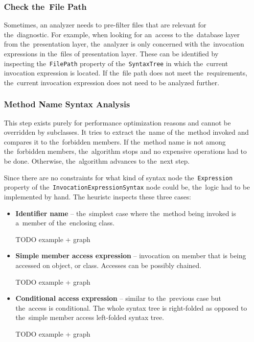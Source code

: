 \documentclass[
  digital, %
  table,   %
  lof,     %
  lot,     %
  oneside,
]{fithesis3}
\begin{document}
\subsubsection{Check the~File Path}
Sometimes, an analyzer needs to pre-filter files that are relevant for the~diagnostic. For example, when looking for an~access to the~database layer from the~presentation layer, the~analyzer is only concerned with the~invocation expressions in the~files of presentation layer. These can be identified by inspecting the~\texttt{FilePath} property of the~\texttt{SyntaxTree} in which the~current invocation expression is located. If the~file path does not meet the~requirements, the~current invocation expression does not need to be analyzed further.

\subsubsection{Method Name Syntax Analysis}
This step exists purely for performance optimization reasons and cannot be overridden by subclasses. It tries to extract the~name of the~method invoked and compares it to the~forbidden members. If the~method name is not among the~forbidden members, the~algorithm stops and no expensive operations had to be done. Otherwise, the~algorithm advances to the~next step.

Since there are no constraints for what kind of syntax node the~\texttt{Expression} property of the~\texttt{InvocationExpressionSyntax} node could be, the~logic had to be implemented by hand. The heuristc inspects these three cases:
\begin{itemize}
  \item \textbf{Identifier name} -- the~simplest case where the~method being invoked is a~member of the~enclosing class.

  TODO example + graph
  
  \item \textbf{Simple member access expression} -- invocation on member that is being accessed on object, or class. Accesses can be possibly chained.
  
  TODO example + graph 
    
  \item \textbf{Conditional access expression} -- similar to the~previous case but the~access is conditional. The whole syntax tree is right-folded as opposed to the~simple member access left-folded syntax tree.
  
  TODO example + graph
  
\end{itemize} 
\end{document}
